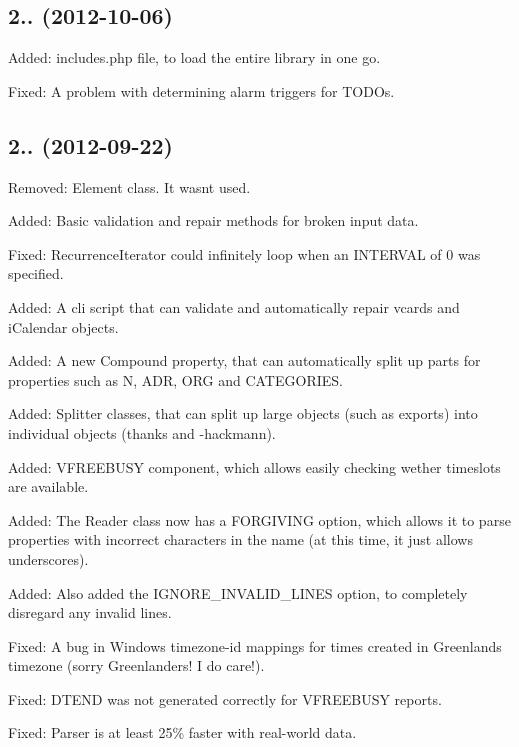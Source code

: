 \subsection*{2.. (2012-\/10-\/06) }


\begin{DoxyItemize}
\item Added\+: includes.\+php file, to load the entire library in one go.
\item Fixed\+: A problem with determining alarm triggers for T\+O\+DO\textquotesingle{}s.
\end{DoxyItemize}

\subsection*{2.. (2012-\/09-\/22) }


\begin{DoxyItemize}
\item Removed\+: Element class. It wasn\textquotesingle{}t used.
\item Added\+: Basic validation and repair methods for broken input data.
\item Fixed\+: Recurrence\+Iterator could infinitely loop when an I\+N\+T\+E\+R\+V\+AL of 0 was specified.
\item Added\+: A cli script that can validate and automatically repair vcards and i\+Calendar objects.
\item Added\+: A new \textquotesingle{}Compound\textquotesingle{} property, that can automatically split up parts for properties such as N, A\+DR, O\+RG and C\+A\+T\+E\+G\+O\+R\+I\+ES.
\item Added\+: Splitter classes, that can split up large objects (such as exports) into individual objects (thanks  and -\/hackmann).
\item Added\+: V\+F\+R\+E\+E\+B\+U\+SY component, which allows easily checking wether timeslots are available.
\item Added\+: The Reader class now has a \textquotesingle{}F\+O\+R\+G\+I\+V\+I\+NG\textquotesingle{} option, which allows it to parse properties with incorrect characters in the name (at this time, it just allows underscores).
\item Added\+: Also added the \textquotesingle{}I\+G\+N\+O\+R\+E\+\_\+\+I\+N\+V\+A\+L\+I\+D\+\_\+\+L\+I\+N\+ES\textquotesingle{} option, to completely disregard any invalid lines.
\item Fixed\+: A bug in Windows timezone-\/id mappings for times created in Greenlands timezone (sorry Greenlanders! I do care!).
\item Fixed\+: D\+T\+E\+ND was not generated correctly for V\+F\+R\+E\+E\+B\+U\+SY reports.
\item Fixed\+: Parser is at least 25\% faster with real-\/world data.
\end{DoxyItemize}

